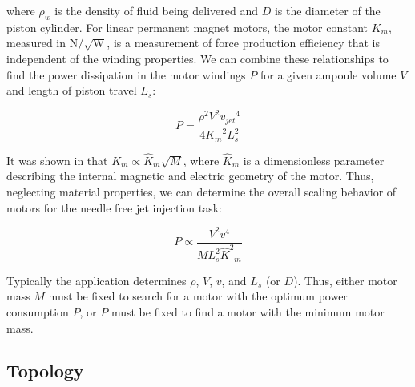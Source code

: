         
        where $\rho_w$ is the density of fluid being delivered and $D$ is the diameter of the piston cylinder. For linear permanent magnet motors, the motor constant $K_m$, measured in $\mathrm{N/\sqrt{W}}$, is a measurement of force production efficiency that is independent of the winding properties. We can combine these relationships to find the power dissipation in the motor windings $P$ for a given ampoule volume $V$ and length of piston travel $L_s$:


        \begin{equation}
            P=\frac{\rho^2V^2{v_{jet}}^4}{4{K_m}^2 L_s^2}
            \label{eq:power dissipation for PMLSMs}
        \end{equation}
        
        
        It was shown in \cite{Ruddy2011} that $K_m \propto {\hat K}_m \sqrt M$, where ${\hat K}_m$ is a dimensionless parameter describing the internal magnetic and electric geometry of the motor. Thus, neglecting material properties, we can determine the overall scaling behavior of motors for the needle free jet injection task:
        
        
        \begin{equation}
            P\propto\frac{V^2v^4}{ {M L_s^2{\hat K^2}_m} }
            \label{eq:scaling law for PMLSMs}
        \end{equation}
        
        
        Typically the application determines $\rho$, $V$, $v$, and $L_s$ (or $D$). Thus, either motor mass $M$ must be fixed to search for a motor with the optimum power consumption $P$, or $P$ must be fixed to find a motor with the minimum motor mass.


    \subsection{Topology}                       \label{Chapter:PMLSM design HM/electromagnetic model/topology}
    
